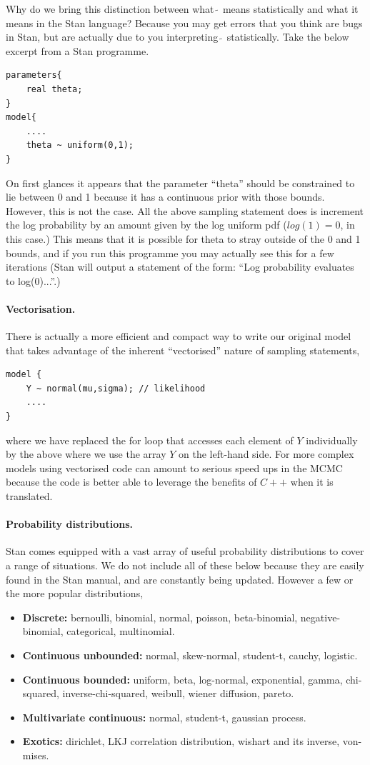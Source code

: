 \documentclass[11pt,fullpage]{book}
\begin{document}
Why do we bring this distinction between what $\tilde{~}$ means statistically and what it means in the Stan language? Because you may get errors that you think are bugs in Stan, but are actually due to you interpreting $\tilde{~}$ statistically. Take the below excerpt from a Stan programme.
	\begin{verbatim}
parameters{
    real theta;
}
model{
    ....
    theta ~ uniform(0,1);
}
	\end{verbatim}
On first glances it appears that the parameter ``theta'' should be constrained to lie between 0 and 1 because it has a continuous prior with those bounds. However, this is not the case. All the above sampling statement does is increment the log probability by an amount given by the log uniform pdf ($log(1)=0$, in this case.) This means that it is possible for theta to stray outside of the 0 and 1 bounds, and if you run this programme you may actually see this for a few iterations (Stan will output a statement of the form: ``Log probability evaluates to log(0)...''.)

\paragraph{Vectorisation.} There is actually a more efficient and compact way to write our original model that takes advantage of the inherent ``vectorised'' nature of sampling statements, 
	\begin{verbatim}
model {
    Y ~ normal(mu,sigma); // likelihood
    ....
}
	\end{verbatim}
where we have replaced the for loop that accesses each element of $Y$ individually by the above where we use the array $Y$ on the left-hand side. For more complex models using vectorised code can amount to serious speed ups in the MCMC because the code is better able to leverage the benefits of $C++$ when it is translated.

\paragraph{Probability distributions.} Stan comes equipped with a vast array of useful probability distributions to cover a range of situations. We do not include all of these below because they are easily found in the Stan manual, and are constantly being updated. However a few or the more popular distributions,

\begin{itemize}
\item \textbf{Discrete:} bernoulli, binomial,  normal, poisson, beta-binomial, negative-binomial, categorical, multinomial.
\item \textbf{Continuous unbounded:} normal, skew-normal, student-t, cauchy, logistic.
\item\textbf{Continuous bounded:} uniform, beta, log-normal, exponential, gamma, chi-squared, inverse-chi-squared, weibull, wiener diffusion, pareto. 
\item \textbf{Multivariate continuous:} normal, student-t, gaussian process.
\item \textbf{Exotics:} dirichlet, LKJ correlation distribution, wishart and its inverse, von-mises.
\end{itemize}
\end{document}
